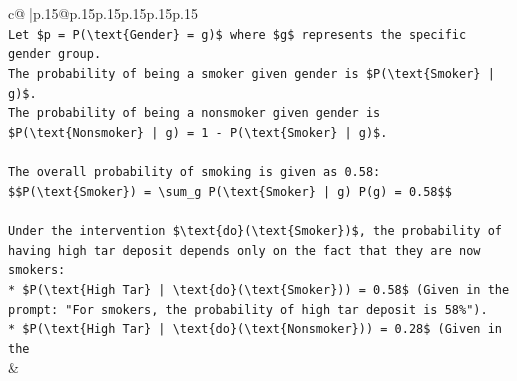 \documentclass{article}
\begin{document}
{\begin{supertabular}{c@{$\;$}|p{.15\linewidth}@{}p{.15\linewidth}p{.15\linewidth}p{.15\linewidth}p{.15\linewidth}p{.15\linewidth}}
{{{\\ 
\texttt{Let \$p = P(\textbackslash{}text\{Gender\} = g)\$ where \$g\$ represents the specific gender group.} \\
\texttt{The probability of being a smoker given gender is \$P(\textbackslash{}text\{Smoker\} | g)\$.} \\
\texttt{The probability of being a nonsmoker given gender is \$P(\textbackslash{}text\{Nonsmoker\} | g) = 1 {-} P(\textbackslash{}text\{Smoker\} | g)\$.} \\
\\ 
\texttt{The overall probability of smoking is given as 0.58:} \\
\texttt{\$\$P(\textbackslash{}text\{Smoker\}) = \textbackslash{}sum\_g P(\textbackslash{}text\{Smoker\} | g) P(g) = 0.58\$\$} \\
\\ 
\texttt{Under the intervention \$\textbackslash{}text\{do\}(\textbackslash{}text\{Smoker\})\$, the probability of having high tar deposit depends only on the fact that they are now smokers:} \\
\texttt{*   \$P(\textbackslash{}text\{High Tar\} | \textbackslash{}text\{do\}(\textbackslash{}text\{Smoker\})) = 0.58\$ (Given in the prompt: "For smokers, the probability of high tar deposit is 58\%").} \\
\texttt{*   \$P(\textbackslash{}text\{High Tar\} | \textbackslash{}text\{do\}(\textbackslash{}text\{Nonsmoker\})) = 0.28\$ (Given in the} \\
            }
        }
    }
    & \\ \\


\end{supertabular}}
\end{document}
